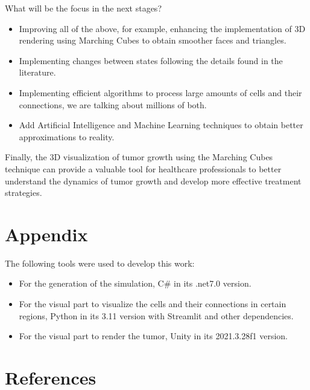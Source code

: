 \documentclass[a4paper,11pt]{article}
\begin{document}
{What will be the focus in the next stages? 
\begin{itemize}
    \item Improving all of the above, for example, enhancing the implementation of 3D rendering using Marching Cubes to obtain smoother faces and triangles.
    \item Implementing changes between states following the details found in the literature.
    \item Implementing efficient algorithms to process large amounts of cells and their connections, we are talking about millions of both.
    \item Add Artificial Intelligence and Machine Learning techniques to obtain better approximations to reality.
\end{itemize}

Finally, the 3D visualization of tumor growth using the Marching Cubes technique can provide a valuable tool for healthcare professionals to better understand the dynamics of tumor growth and develop more effective treatment strategies.


\section*{Appendix}

The following tools were used to develop this work:
\begin{itemize}
    \item  For the generation of the simulation, C\# in its .net7.0 version.
    \item For the visual part to visualize the cells and their connections in certain regions, Python in its 3.11 version with Streamlit and other dependencies.
    \item For the visual part to render the tumor, Unity in its 2021.3.28f1 version.
\end{itemize}



\section*{References}
\label{Nada}
\begin{flushleft}

\begin{thebibliography}{99}


\end{thebibliography}
\end{flushleft}}
\end{document}
